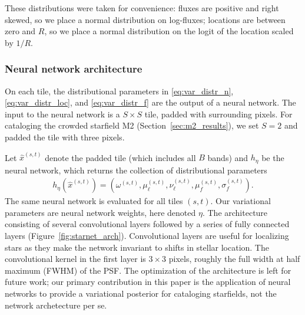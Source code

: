 These distributions were taken for convenience: fluxes are positive and right skewed, so we place a normal distribution on log-fluxes; locations are between zero and $R$, so 
we place a normal distribution on the logit of the location scaled by $1 / R$. 

\subsubsection{Neural network architecture}
\label{sec:nn_archetecture}
On each tile, the distributional parameters 
in \eqref{eq:var_distr_n}, \eqref{eq:var_distr_loc}, and \eqref{eq:var_distr_f} are the output of a neural network.
The input to the neural network is a $S \times S$ tile, padded with surrounding pixels.
For cataloging the crowded starfield M2 (Section~\ref{sec:m2_results}),
we set $S = 2$ and padded the tile with three pixels.

Let $\hat x^{(s,t)}$ denote the padded tile (which includes all $B$ bands) and $h_\eta$ be the neural network, which returns the collection of distributional parameters
\begin{align}
    h_\eta(\hat x^{(s,t)}) = (\omega^{(s,t)}, \mu_\ell^{(s,t)}, \nu_{\ell}^{(s,t)}, \mu_f^{(s,t)}, \sigma^{(s,t)}_f).
    \label{eq:nn_output}
\end{align}
The same neural network is evaluated for all tiles $(s,t)$. Our variational parameters are neural network weights, here denoted $\eta$. 
The architecture consisting of several convolutional layers followed by a series of fully connected layers (Figure~\ref{fig:starnet_arch}). Convolutional layers are useful for localizing stars as they make the network invariant to shifts in stellar location. The convolutional kernel in the first layer is $3\times3$ pixels, roughly the full width at half maximum (FWHM) of the PSF. The optimization of the architecture is left for future work; our primary contribution in this paper is the application of neural networks to provide a variational posterior for cataloging starfields, not the network archetecture per se. 

